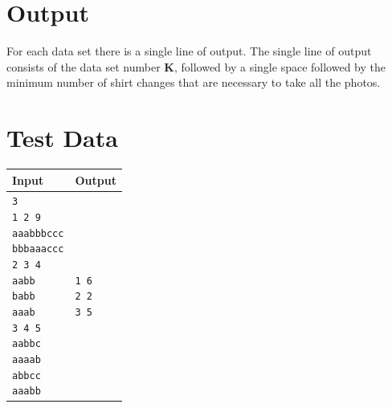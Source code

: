 \documentclass[11pt]{article}
\begin{document}
\section{Output}
For each data set there is a single line of output. The single line of output
consists of the data set number $\boldsymbol{K}$, followed by a single space
followed by the minimum number of shirt changes that are necessary to take all
the photos.

\section{Test Data}
\begin{tabularx}{\textwidth}{|X|X|}
	\hline
	Input & Output \\ \hline
	\parbox[t]{5cm}{
	\texttt{3\\
			1 2 9\\
			aaabbbccc\\
			bbbaaaccc\\
			2 3 4\\
			aabb\\
			babb\\
			aaab\\
			3 4 5\\
			aabbc\\
			aaaab\\
			abbcc\\
			aaabb\\
	}} &
	\parbox[t]{5cm}{
	\texttt{1 6\\
			2 2\\
			3 5\\
			}}\\
	\hline
\end{tabularx}
\end{document}
